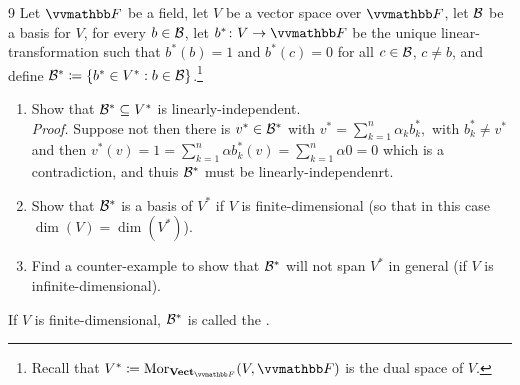 \documentclass{exercises}
\begin{document}
\begin{exr}{}{9}
	Let $\F$ be a field, let $V$ be a vector space over $\F$, let $\basis{B}$ be a basis for $V$, for every $b\in \basis{B}$, let $b^*\colon V\rightarrow \F$ be the unique linear-transformation such that $b^*(b)=1$ and $b^*(c)=0$ for all $c\in \basis{B}$, $c\neq b$, and define $\basis{B}^*\ceqq \{ b^*\in V^*:b\in \basis{B}\}$.\footnote{Recall that $V^*\ceqq \Mor _{\Vect _{\F}}(V,\F )$ is the dual space of $V$.}
	\begin{enumerate}
		\item Show that $\basis{B}^*\subseteq V^*$ is linearly-independent. \\

		\emph{Proof.} Suppose not then there is  $v^* \in \scriptb^*$ with $v^* = \sum_{k=1}^n \alpha_k b_k^*,$ with $b_k^* \neq v^*$ and then $v^*(v) = 1 = \sum_{k=1}^n \alpha b_k^*(v) = \sum_{k=1}^n \alpha 0  = 0$ which is a contradiction, and thuis $\scriptb^*$ must be linearly-independenrt.\\
		
		\item Show that $\basis{B}^*$ is a basis of $V^*$ if $V$ is finite-dimensional (so that in this case $\dim (V)=\dim (V^*)$).
		\item Find a counter-example to show that $\basis{B}^*$ will not span $V^*$ in general (if $V$ is infinite-dimensional).
	\end{enumerate}
	\begin{rmk}
		If $V$ is finite-dimensional, $\basis{B}^*$ is called the .
	\end{rmk}
\end{exr}

\vspace{-10pt} %
\end{document}
